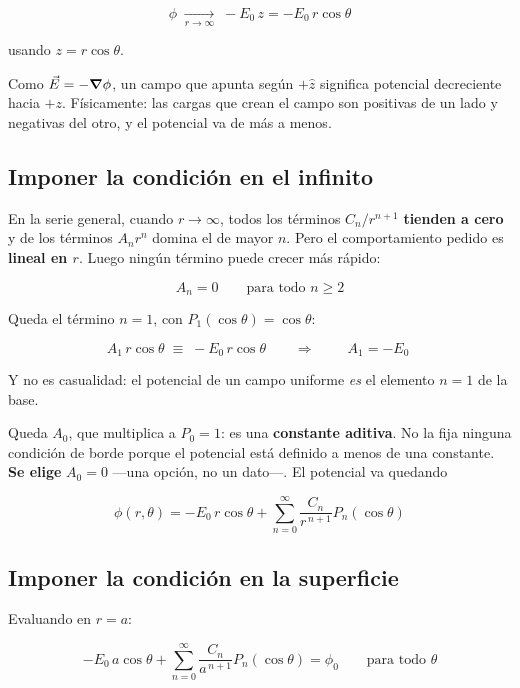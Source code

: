 \documentclass[12pt,a4paper]{article}
\begin{document}
\[
\phi \;\xrightarrow[r\to\infty]{}\; -E_0\,z = -E_0\,r\cos\theta
\]

usando $z = r\cos\theta$.

\begin{notebox}
Como $\vec E = -\grad\phi$, un campo que apunta según $+\hat z$ significa
potencial decreciente hacia $+z$. Físicamente: las cargas que crean el campo son
positivas de un lado y negativas del otro, y el potencial va de más a menos.
\end{notebox}

\subsection{Imponer la condición en el infinito}

En la serie general, cuando $r\to\infty$, todos los términos $C_n/r^{n+1}$
\textbf{tienden a cero} y de los términos $A_n r^n$ domina el de mayor $n$. Pero
el comportamiento pedido es \textbf{lineal en $r$}. Luego ningún término puede
crecer más rápido:

\[
A_n = 0 \qquad\text{para todo } n \ge 2
\]

Queda el término $n=1$, con $P_1(\cos\theta) = \cos\theta$:

\[
A_1\,r\cos\theta \;\equiv\; -E_0\,r\cos\theta
\qquad\Longrightarrow\qquad
\boxed{\;A_1 = -E_0\;}
\]

\begin{notebox}
Y no es casualidad: el potencial de un campo uniforme \emph{es} el elemento $n=1$
de la base.
\end{notebox}

Queda $A_0$, que multiplica a $P_0 = 1$: es una \textbf{constante aditiva}. No la
fija ninguna condición de borde porque el potencial está definido a menos de una
constante. \textbf{Se elige} $A_0 = 0$ ---una opción, no un dato---. El potencial
va quedando

\[
\phi(r,\theta) = -E_0\,r\cos\theta + \sum_{n=0}^{\infty}\frac{C_n}{r^{\,n+1}}P_n(\cos\theta)
\]

\subsection{Imponer la condición en la superficie}

Evaluando en $r=a$:

\[
-E_0\,a\cos\theta + \sum_{n=0}^{\infty}\frac{C_n}{a^{\,n+1}}P_n(\cos\theta) = \phi_0
\qquad\text{para todo }\theta
\]
\end{document}
